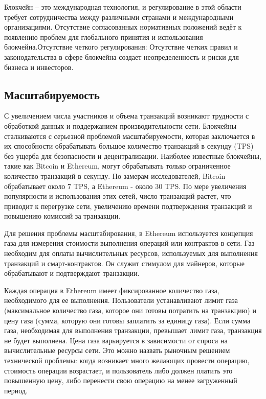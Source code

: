 Блокчейн -- это международная технология, и регулирование в этой области требует сотрудничества между различными странами и международными организациями. Отсутствие согласованных нормативных положений ведёт к появлению проблем для глобального принятия и использования блокчейна.Отсутствие четкого регулирования: Отсутствие четких правил и законодательства в сфере блокчейна создает неопределенность и риски для бизнеса и инвесторов.

\subsection{Масштабируемость}

С увеличением числа участников и объема транзакций возникают трудности с обработкой данных и поддержанием производительности сети. Блокчейны сталкиваются с серьезной проблемой масштабируемости, которая заключается в их способности обрабатывать большое количество транзакций в секунду (TPS) без ущерба для безопасности и децентрализации. Наиболее известные блокчейны, такие как Bitcoin и Ethereum, могут обрабатывать только ограниченное количество транзакций в секунду. По замерам исследователей, Bitcoin обрабатывает около 7 TPS, а Ethereum - около 30 TPS\cite{label60}. По мере увеличения популярности и использования этих сетей, число транзакций растет, что приводит к перегрузке сети, увеличению времени подтверждения транзакций и повышению комиссий за транзакции.

Для решения проблемы масштабирования, в Ethereum используется концепция газа для измерения стоимости выполнения операций или контрактов в сети. Газ необходим для оплаты вычислительных ресурсов, используемых для выполнения транзакций и смарт-контрактов. Он служит стимулом для майнеров, которые обрабатывают и подтверждают транзакции.

Каждая операция в Ethereum имеет фиксированное количество газа, необходимого для ее выполнения. Пользователи устанавливают лимит газа (максимальное количество газа, которое они готовы потратить на транзакцию) и цену газа (сумма, которую они готовы заплатить за единицу газа). Если сумма газа, необходимая для выполнения транзакции, превышает лимит газа, транзакция не будет выполнена. Цена газа варьируется в зависимости от спроса на вычислительные ресурсы сети\cite{label31}. Это можно назвать рыночным решением технической проблемы: когда возникает много желающих провести операцию, стоимость операции возрастает, и пользователь либо должен платить это повышенную цену, либо перенести свою операцию на менее загруженный период.

